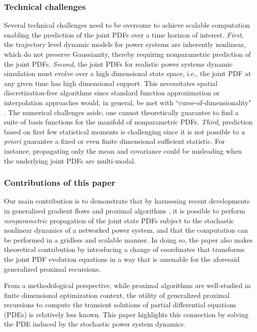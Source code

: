 \documentclass[10pt,twocolumn]{IEEEtran}
\begin{document}
\subsubsection{Technical challenges}\label{subsubsec:technicalchallenges}
Several technical challenges need to be overcome to achieve scalable computation enabling the prediction of the joint PDFs over a time horizon of interest. \emph{First}, the trajectory level dynamic models for power systems are inherently nonlinear, which do not preserve Gaussianity, thereby requiring nonparametric prediction of the joint PDFs. \emph{Second}, the joint PDFs for realistic power systems dynamic simulation must evolve over a high dimensional state space, i.e., the joint PDF at any given time has high dimensional support. This necessitates spatial discretization-free algorithms since standard function approximation or interpolation approaches would, in general, be met with ``curse-of-dimensionality" \cite{bellman1957}. The numerical challenges aside, one cannot theoretically guarantee to find a suite of basis functions for the manifold of nonparametric PDFs. \emph{Third}, prediction based on first few statistical moments is challenging since it is not possible to \emph{a priori} guarantee a fixed or even finite dimensional sufficient statistic. For instance, propagating only the mean and covariance could be misleading when the underlying joint PDFs are multi-modal.

\subsubsection{Contributions of this paper}
Our main contribution is to demonstrate that by harnessing recent developments in generalized gradient flows \cite{ambrosio2008gradient} and proximal algorithms \cite{parikh2014proximal}, it is possible to perform \emph{nonparametric} propagation of the joint state PDFs subject to the stochastic nonlinear dynamics of a networked power system, and that the computation can be performed in a gridless and scalable manner. In doing so, the paper also makes theoretical contribution by introducing a change of coordinates that transforms the joint PDF evolution equations in a way that is amenable for the aforesaid generalized proximal recursions.

From a methodological perspective, while proximal algorithms are well-studied \cite{parikh2014proximal,rockafellar1976monotone,combettes2011proximal} in finite dimensional optimization context, the utility of generalized proximal recursions to compute the transient solutions of partial differential equations (PDEs) is relatively less known. This paper highlights this connection by solving the PDE induced by the stochastic power system dynamics.
\end{document}
